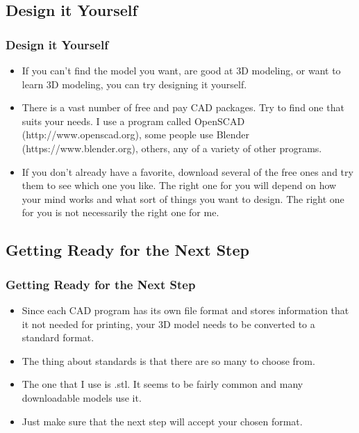 \documentclass[english,10pt]{beamer}
\begin{document}
\subsection{Design it Yourself}
\begin{frame}
  \frametitle{Design it Yourself}
  \begin{itemize}
    \item If you can't find the model you want, are good at 3D modeling, or want to learn 3D modeling, you can try designing it yourself.
  
    \item There is a vast number of free and pay CAD packages.  Try to find one that suits your needs.  I use a program called OpenSCAD (http://www.openscad.org), some people use Blender (https://www.blender.org), others, any of a variety of other programs.
  
    \item If you don't already have a favorite, download several of the free ones and try them to see which one you like.  The right one for you will depend on how your mind works and what sort of things you want to design.  The right one for you is not necessarily the right one for me.
  \end{itemize}
\end{frame}

\subsection{Getting Ready for the Next Step}
\begin{frame}
  \frametitle{Getting Ready for the Next Step}
  \begin{itemize}
    \item Since each CAD program has its own file format and stores information that it not needed for printing, your 3D model needs to be converted to a standard format.
    \item The thing about standards is that there are so many to choose from.
    \item The one that I use is .stl.  It seems to be fairly common and many downloadable models use it.
    \item Just make sure that the next step will accept your chosen format.
  \end{itemize}
\end{frame}
\end{document}
